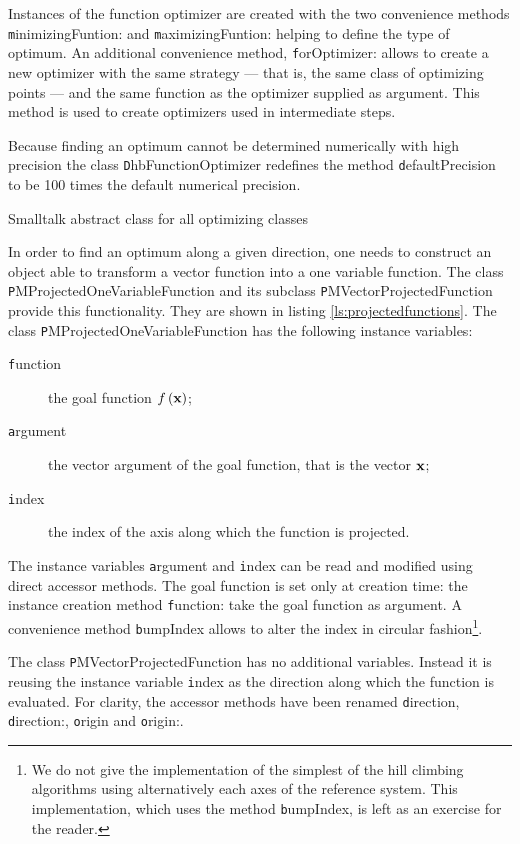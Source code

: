 Instances of the function optimizer are created with the two
convenience methods {\texttt minimizingFuntion:} and {\texttt
maximizingFuntion:} helping to define the type of optimum. An
additional convenience method, {\texttt forOptimizer:} allows to
create a new optimizer with the same strategy --- that is, the
same class of optimizing points --- and the same function as the
optimizer supplied as argument.
This method is used to create optimizers used in intermediate steps.

Because finding an optimum cannot be determined numerically with
high precision \cite{Press} the class {\texttt DhbFunctionOptimizer}
redefines the method {\texttt defaultPrecision} to be 100 times the
default numerical precision.
\begin{listing} Smalltalk abstract class for all optimizing classes \label{ls:optimizerAbstract}

\end{listing}

In order to find an optimum along a given direction, one needs to
construct an object able to transform a vector function into a one
variable function. The class {\texttt PMProjectedOneVariableFunction}
and its subclass {\texttt PMVectorProjectedFunction} provide this
functionality. They are shown in listing
\ref{ls:projectedfunctions}. The class {\texttt
PMProjectedOneVariableFunction} has the following instance
variables:
\begin{description}
  \item[\texttt function] the goal function $f\left({\textbf x}\right)$;
  \item[\texttt argument] the vector argument of the goal function,
  that is the vector ${\textbf x}$;
  \item[\texttt index] the index of the axis along which the function
  is projected.
\end{description}
The instance variables {\texttt argument} and {\texttt index} can be read
and modified using direct accessor methods. The goal function is
set only at creation time: the instance creation method {\texttt
function:} take the goal function as argument. A convenience
method {\texttt bumpIndex} allows to alter the index in circular
fashion\footnote{We do not give the implementation of the simplest
of the hill climbing algorithms using alternatively each axes of
the reference system. This implementation, which uses the method
{\texttt bumpIndex}, is left as an exercise for the reader.}.

The class {\texttt PMVectorProjectedFunction} has no additional
variables. Instead it is reusing the instance variable {\texttt index}
as the direction along which the function is evaluated. For
clarity, the accessor methods have been renamed {\texttt direction},
{\texttt direction:}, {\texttt origin} and {\texttt origin:}.

